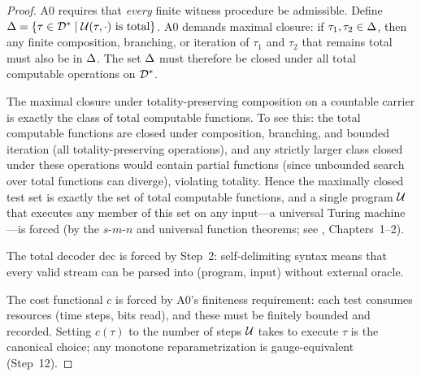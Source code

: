 \begin{proof}
A0 requires that \emph{every} finite witness procedure be admissible.
Define $\Delta = \{\tau \in \mathcal{D}^* \mid \mathcal{U}(\tau, \cdot) \text{ is total}\}$.
A0 demands maximal closure: if $\tau_1, \tau_2 \in \Delta$, then any finite
composition, branching, or iteration of $\tau_1$ and $\tau_2$ that remains
total must also be in $\Delta$.  The set $\Delta$ must therefore be closed
under all total computable operations on $\mathcal{D}^*$.

The maximal closure under totality-preserving composition on a countable
carrier is exactly the class of total computable functions.  To see this:
the total computable functions are closed under composition, branching, and
bounded iteration (all totality-preserving operations), and any strictly
larger class closed under these operations would contain partial functions
(since unbounded search over total functions can diverge), violating
totality.  Hence the maximally closed test set is exactly the set of total
computable functions, and a single program $\mathcal{U}$ that executes any member
of this set on any input---a universal Turing machine---is forced (by the
$s$-$m$-$n$ and universal function theorems; see \citealt{rogers1967},
Chapters~1--2).

The total decoder $\mathrm{dec}$ is forced by Step~2: self-delimiting
syntax means that every valid stream can be parsed into (program, input)
without external oracle.

The cost functional $c$ is forced by A0's finiteness requirement: each
test consumes resources (time steps, bits read), and these must be
finitely bounded and recorded.  Setting $c(\tau)$ to the number of steps
$\mathcal{U}$ takes to execute $\tau$ is the canonical choice; any monotone
reparametrization is gauge-equivalent (Step~12).


\end{proof}
